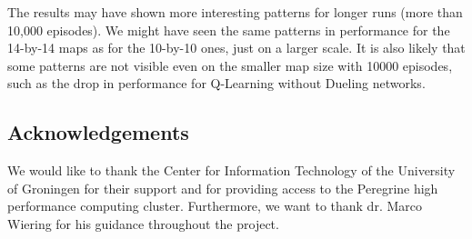 The results may have shown more interesting patterns for longer runs (more than 10,000 episodes). We might have seen the same patterns in performance for the 14-by-14 maps as for the 10-by-10 ones, just on a larger scale. It is also likely that some patterns are not visible even on the smaller map size with 10000 episodes, such as the drop in performance for Q-Learning without Dueling networks.

\subsection*{Acknowledgements}\label{sec:acknowledgements}
We would like to thank the Center for Information Technology of the University of Groningen for their support and for providing access to the Peregrine high performance computing cluster. Furthermore, we want to thank dr. Marco Wiering for his guidance throughout the project.